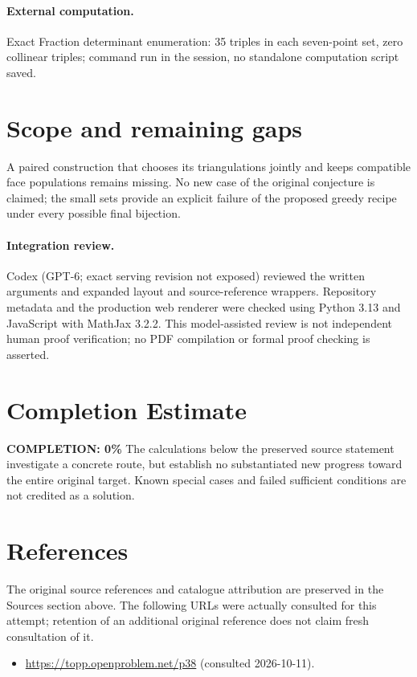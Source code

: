 \documentclass[11pt]{article}
\begin{document}
\paragraph{External computation.} Exact Fraction determinant enumeration: 35 triples in each seven-point set, zero collinear triples; command run in the session, no standalone computation script saved.
\section{Scope and remaining gaps}
A paired construction that chooses its triangulations jointly and keeps
compatible face populations remains missing. No new case of the original
conjecture is claimed; the small sets provide an explicit failure of the proposed
greedy recipe under every possible final bijection.
\paragraph{Integration review.} Codex (GPT-6; exact serving revision not exposed) reviewed the written arguments and expanded layout and source-reference wrappers. Repository metadata and the production web renderer were checked using Python 3.13 and JavaScript with MathJax 3.2.2. This model-assisted review is not independent human proof verification; no PDF compilation or formal proof checking is asserted.

\section{Completion Estimate}
\noindent\textbf{COMPLETION: 0\%}
The calculations below the preserved source statement investigate a concrete route,
but establish no substantiated new progress toward the entire original target.
Known special cases and failed sufficient conditions are not credited as a solution.
\section{References}
The original source references and catalogue attribution are preserved in the
Sources section above. The following URLs were actually consulted for this attempt;
retention of an additional original reference does not claim fresh consultation of it.
\begin{itemize}
\item \url{https://topp.openproblem.net/p38} (consulted 2026-10-11). 
\end{itemize}
\end{document}

